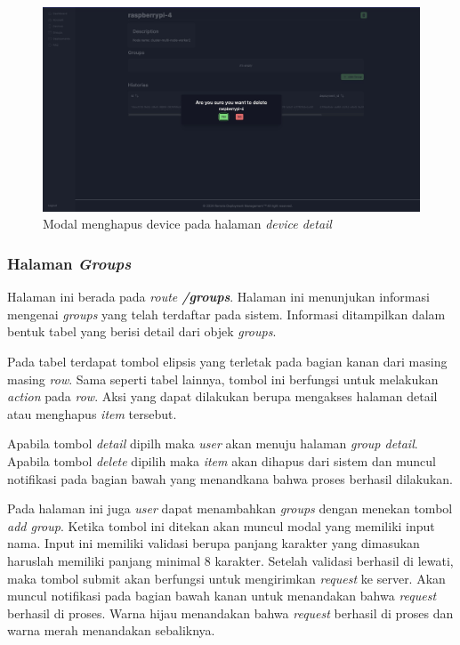 \begin{figure}[h]
  \centering
  \includegraphics[width=1\textwidth]{resources/chapter-4/dashboard/device-detail-delete.jpg}
  \caption{Modal menghapus device pada halaman \textit{device detail}}
  \label{fig:halaman-device-detail-delete}
\end{figure}

\pagebreak

\subsubsection{Halaman \textit{Groups}}
Halaman ini berada pada \textit{route \textbf{/groups}}. Halaman ini menunjukan informasi mengenai \textit{groups} yang telah terdaftar pada sistem. Informasi ditampilkan dalam bentuk tabel yang berisi detail dari objek \textit{groups}.

Pada tabel terdapat tombol elipsis yang terletak pada bagian kanan dari masing masing \textit{row}. Sama seperti tabel lainnya, tombol ini berfungsi untuk melakukan \textit{action} pada \textit{row}. Aksi yang dapat dilakukan berupa mengakses halaman detail atau menghapus \textit{item} tersebut.

Apabila tombol \textit{detail} dipilh maka \textit{user} akan menuju halaman \textit{group detail}. Apabila tombol \textit{delete} dipilih maka \textit{item} akan dihapus dari sistem dan muncul notifikasi pada bagian bawah yang menandkana bahwa proses berhasil dilakukan.

Pada halaman ini juga \textit{user} dapat menambahkan \textit{groups} dengan menekan tombol \textit{add group}. Ketika tombol ini ditekan akan muncul modal yang memiliki input nama. Input ini memiliki validasi berupa panjang karakter yang dimasukan haruslah memiliki panjang minimal 8 karakter. Setelah validasi berhasil di lewati, maka tombol submit akan berfungsi untuk mengirimkan \textit{request} ke server. Akan muncul notifikasi pada bagian bawah kanan untuk menandakan bahwa \textit{request} berhasil di proses. Warna hijau menandakan bahwa \textit{request} berhasil di proses dan warna merah menandakan sebaliknya.

